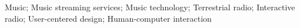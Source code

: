 \noindent Music; Music streaming services; Music technology; Terrestrial radio; Interactive radio; User-centered design; Human-computer interaction